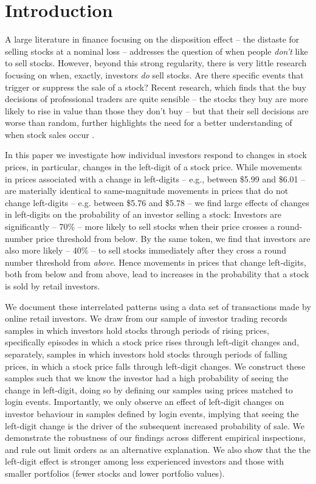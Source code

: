 \section{Introduction} \label{sec:introduction}

A large literature in finance focusing on the disposition effect \citep [e.g.,][]{weber1998disposition, frazzini2006disposition, barberis2009drives, ben2012investors,  li2013prospect} -- the distaste for selling stocks at a nominal loss -- addresses the question of when people \textit{don't} like to sell stocks.  However, beyond this strong regularity, there is very little research focusing on when, exactly, investors \textit{do} sell stocks. Are there specific events that trigger or suppress the sale of a stock? 
Recent research, which finds that the buy decisions of professional traders are quite sensible -- the stocks they buy are more likely to rise in value than those they don't buy -- but that their sell decisions are worse than random, further highlights the need for a better understanding of when stock sales occur \citep{akepanidtaworn2019selling}. 

In this paper we investigate how individual investors respond to changes in stock prices, in particular, changes in the left-digit of a stock price. While movements in prices associated with a change in left-digits -- e.g., between \$5.99 and \$6.01 -- are materially identical to same-magnitude movements in prices that do not change left-digits -- e.g. between \$5.76 and \$5.78 -- we find large effects of changes in left-digits on the probability of an investor selling a stock:  Investors are significantly -- 70\% -- more likely to sell stocks when their price crosses a round-number price threshold from below. By the same token, we find that investors are also more likely -- 40\% -- to sell stocks immediately after they cross a round number threshold from \textit{above}. Hence movements in prices that change left-digits, both from below and from above, lead to increases in the probability that a stock is sold by retail investors.  

We document these interrelated patterns using a data set of transactions made by online retail investors. We draw from our sample of investor trading records samples in which investors hold stocks through periods of rising prices, specifically episodes in which a stock price rises through left-digit changes and, separately, samples in which investors hold stocks through periods of falling prices, in which a stock price falls through left-digit changes. We construct these samples such that we know the investor had a high probability of seeing the change in left-digit, doing so by defining our samples using prices matched to login events. Importantly, we only observe an effect of left-digit changes on investor behaviour in samples defined by login events, implying that seeing the left-digit change is the driver of the subsequent increased probability of sale. We demonstrate the robustness of our findings across different empirical inspections, and rule out limit orders as an alternative explanation. We also show that the the left-digit effect is stronger among less experienced investors and those with smaller portfolios (fewer stocks and lower portfolio values).  

